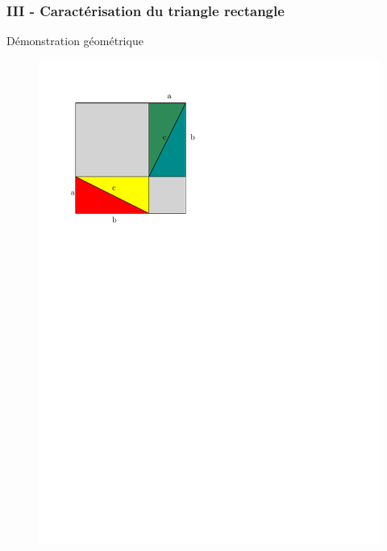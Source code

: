\documentclass{beamer}
\begin{document}
\begin{frame}
  \frametitle{III - Caractérisation du triangle rectangle}

  \begin{block}{}
	Démonstration géométrique
  \end{block}

	\begin{multicols}{2}
    	\begin{figure}[H]
	  \centering
	  \includegraphics[width=\linewidth]{sources/1/demo-pytha-1.pdf}
	\end{figure}
    	\begin{figure}[H]
	  \centering

\end{figure}
\end{multicols}
\end{frame}
\end{document}
